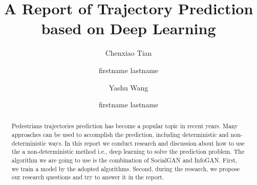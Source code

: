 \documentclass[sigconf]{acmart}
\begin{document}
\title{A Report of Trajectory Prediction based on Deep Learning}


\author{Chenxiao Tian}

\author{firstname lastname}
\affiliation{\institution{}}

\author{Yashu Wang}

\author{firstname lastname}
\affiliation{\institution{}}

\renewcommand{\shortauthors}{team 4: Trajectory Prediction}







\begin{abstract}

Pedestrians trajectories prediction has become a popular topic in recent years. Many approaches can be used to accomplish the prediction, including deterministic and non-deterministic ways. In this report we conduct research and discussion about how to use the a non-deterministic method i.e., deep learning to solve the prediction problem. The algorithm we are going to use is the combination of SocialGAN and InfoGAN. First, we train a model by the adopted algorithms. Second, during the research, we propose our research questions and try to answer it in the report.
\end{abstract}
\end{document}
